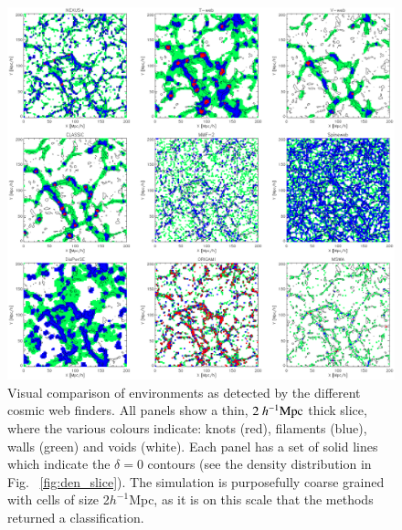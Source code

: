\begin{figure}
 \includegraphics[width=\textwidth]{Chapter3b/FIGS/fig1v4a.eps}
 \vspace{-.4cm}
 \caption{Visual comparison of environments as detected by the different cosmic web finders. All panels show a thin, $2~h^{-1}\rm Mpc$ thick slice, where the various colours indicate: knots (red), filaments (blue), walls (green) and voids (white). Each panel has a set of solid lines which indicate the $\delta=0$ contours (see the density distribution in Fig.~ \ref{fig:den_slice}). The simulation is purposefully coarse grained with cells of size 2$h^{-1}$Mpc, as it is on this scale that the methods returned a classification.}
 \label{fig:env_slice_a}
\end{figure}

